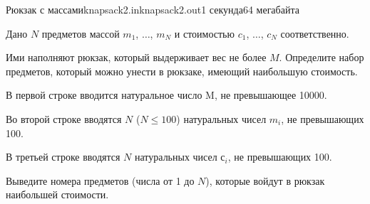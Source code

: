\documentclass[12pt,a4paper,oneside,twocolumn,landscape]{article}
\renewcommand{\le}{\leqslant}
\begin{document}
\raggedbottom

\begin{problem}{Рюкзак с массами}{knapsack2.in}{knapsack2.out}{1 секунда}{64 мегабайта}{}

Дано $N$ предметов массой $m_1$, $\dots$, $m_N$ и стоимостью $c_1$, $\dots$, $c_N$ 
соответственно.

Ими наполняют рюкзак, который выдерживает вес не более $M$. 
Определите набор предметов, который можно унести в рюкзаке, имеющий наибольшую стоимость.

\InputFile
В первой строке вводится натуральное число M, не превышающее 10000.

Во второй строке вводятся $N$ ($N \le 100$) натуральных чисел $m_i$, не превышающих 100.

В третьей строке вводятся $N$ натуральных чисел $с_i$, не превышающих 100.

\OutputFile
Выведите номера предметов (числа от 1 до $N$), 
которые войдут в рюкзак наибольшей стоимости.


\Example

\begin{example}
%
\end{example}


\end{problem}
\end{document}
